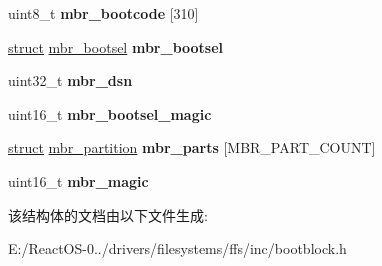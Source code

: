 \begin{DoxyCompactItemize}
\begin{tabbing}
\end{tabbing}\item 
\mbox{\label{structmbr__sector_ac7eeef9a60476b32610fca1d61003991}} 
uint8\+\_\+t {\bfseries mbr\+\_\+bootcode} \mbox{[}310\mbox{]}
\item 
\mbox{\label{structmbr__sector_ae84e2f4f3659c4241e51ddc2f50d38d9}} 
\hyperlink{interfacestruct}{struct} \hyperlink{structmbr__bootsel}{mbr\+\_\+bootsel} {\bfseries mbr\+\_\+bootsel}
\item 
\mbox{\label{structmbr__sector_a8720133ab1c0901ff6e331cf8ead794c}} 
uint32\+\_\+t {\bfseries mbr\+\_\+dsn}
\item 
\mbox{\label{structmbr__sector_ad615f7352c9d977e8ce507954b4e66ca}} 
uint16\+\_\+t {\bfseries mbr\+\_\+bootsel\+\_\+magic}
\item 
\mbox{\label{structmbr__sector_adf9d7bdfde2f952ab020d47590c38587}} 
\hyperlink{interfacestruct}{struct} \hyperlink{structmbr__partition}{mbr\+\_\+partition} {\bfseries mbr\+\_\+parts} \mbox{[}M\+B\+R\+\_\+\+P\+A\+R\+T\+\_\+\+C\+O\+U\+NT\mbox{]}
\item 
\mbox{\label{structmbr__sector_ae41187c2fcb7eddbebe2886700ddd6eb}} 
uint16\+\_\+t {\bfseries mbr\+\_\+magic}
\end{DoxyCompactItemize}


该结构体的文档由以下文件生成\+:\begin{DoxyCompactItemize}
\item 
E\+:/\+React\+O\+S-\/0../drivers/filesystems/ffs/inc/bootblock.\+h\end{DoxyCompactItemize}
